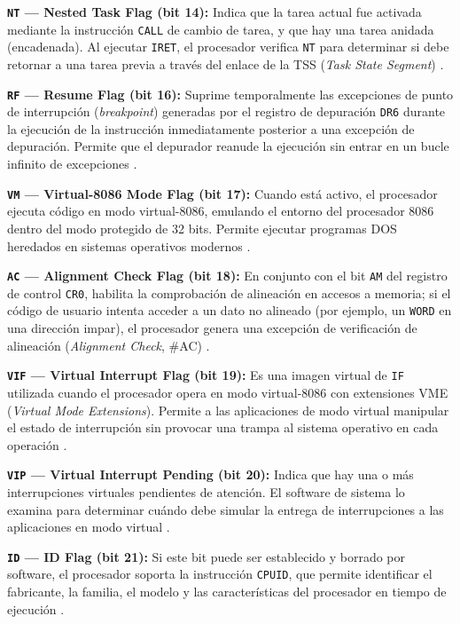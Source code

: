 \documentclass[a4paper,12pt]{article}
\begin{document}
\textbf{\texttt{NT} — Nested Task Flag (bit 14):} Indica que la tarea actual fue activada mediante la instrucción \texttt{CALL} de cambio de tarea, y que hay una tarea anidada (encadenada). Al ejecutar \texttt{IRET}, el procesador verifica \texttt{NT} para determinar si debe retornar a una tarea previa a través del enlace de la TSS (\textit{Task State Segment}) \cite{stallings2019computer}.

\textbf{\texttt{RF} — Resume Flag (bit 16):} Suprime temporalmente las excepciones de punto de interrupción (\textit{breakpoint}) generadas por el registro de depuración \texttt{DR6} durante la ejecución de la instrucción inmediatamente posterior a una excepción de depuración. Permite que el depurador reanude la ejecución sin entrar en un bucle infinito de excepciones \cite{irvine2020assembly}.

\textbf{\texttt{VM} — Virtual-8086 Mode Flag (bit 17):} Cuando está activo, el procesador ejecuta código en modo virtual-8086, emulando el entorno del procesador 8086 dentro del modo protegido de 32 bits. Permite ejecutar programas DOS heredados en sistemas operativos modernos \cite{tanenbaum2013structured}.

\textbf{\texttt{AC} — Alignment Check Flag (bit 18):} En conjunto con el bit \texttt{AM} del registro de control \texttt{CR0}, habilita la comprobación de alineación en accesos a memoria; si el código de usuario intenta acceder a un dato no alineado (por ejemplo, un \texttt{WORD} en una dirección impar), el procesador genera una excepción de verificación de alineación (\textit{Alignment Check}, \#AC) \cite{elahi2022computer}.

\textbf{\texttt{VIF} — Virtual Interrupt Flag (bit 19):} Es una imagen virtual de \texttt{IF} utilizada cuando el procesador opera en modo virtual-8086 con extensiones VME (\textit{Virtual Mode Extensions}). Permite a las aplicaciones de modo virtual manipular el estado de interrupción sin provocar una trampa al sistema operativo en cada operación \cite{stallings2019computer}.

\textbf{\texttt{VIP} — Virtual Interrupt Pending (bit 20):} Indica que hay una o más interrupciones virtuales pendientes de atención. El software de sistema lo examina para determinar cuándo debe simular la entrega de interrupciones a las aplicaciones en modo virtual \cite{stallings2019computer}.

\textbf{\texttt{ID} — ID Flag (bit 21):} Si este bit puede ser establecido y borrado por software, el procesador soporta la instrucción \texttt{CPUID}, que permite identificar el fabricante, la familia, el modelo y las características del procesador en tiempo de ejecución \cite{irvine2020assembly}.
\end{document}
